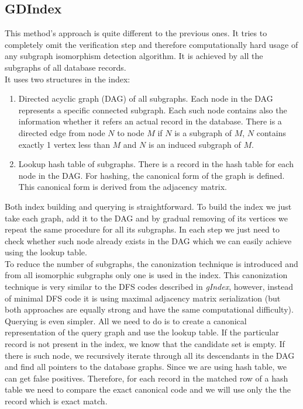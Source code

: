 \subsection{GDIndex}

This method's approach is quite different to the previous ones. It tries to completely omit the verification step and therefore computationally hard usage of any subgraph isomorphism detection algorithm. It is achieved by all the subgraphs of all database records.\\


It uses two structures in the index:

\begin{enumerate}
	\item Directed acyclic graph (DAG) of all subgraphs. Each node in the DAG represents a specific connected subgraph. Each such node contains also the information whether it refers an actual record in the database. There is a directed edge from node $ N $ to node $ M $ if $ N $ is a subgraph of $ M $, $ N $ contains exactly 1 vertex less than $ M $ and $ N $ is an induced subgraph of $ M $.
	
	\item Lookup hash table of subgraphs. There is a record in the hash table for each node in the DAG. For hashing, the canonical form of the graph is defined. This canonical form is derived from the adjacency matrix.
\end{enumerate}

Both index building and querying is straightforward. To build the index we just take each graph, add it to the DAG and by gradual removing of its vertices we repeat the same procedure for all its subgraphs. In each step we just need to check whether such node already exists in the DAG which we can easily achieve using the lookup table.\\

To reduce the number of subgraphs, the canonization technique is introduced and from all isomorphic subgraphs only one is used in the index. This canonization technique is very similar to the DFS codes described in \textit{gIndex}, however, instead of minimal DFS code it is using maximal adjacency matrix serialization (but both approaches are equally strong and have the same computational difficulty).\\

Querying is even simpler. All we need to do is to create a canonical representation of the query graph and use the lookup table. If the particular record is not present in the index, we know that the candidate set is empty. If there is such node, we recursively iterate through all its descendants in the DAG and find all pointers to the database graphs. Since we are using hash table, we can get false positives. Therefore, for each record in the matched row of a hash table we need to compare the exact canonical code and we will use only the the record which is exact match.\\

